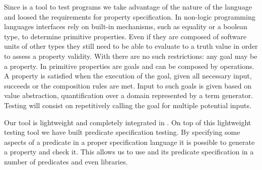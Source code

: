 

Since \plqc{} is a tool to test \Prolog{} programs we take advantage of
the nature of the language and loosed the requirements for property
specification.
%
In non-logic programming languages interfaces rely on built-in mechanisms, such as equality or
a boolean type, to determine primitive properties. %
%
Even if they are composed of software units of other types they still
need to be able to evaluate to a truth value in order to assess a
property validity.
%
With \Prolog{} there are no such restrictions: any goal may be a property.
%
In \plqc{} primitive properties are %
\Prolog{} goals and can be composed by \plqc{} operations.%
%
A property is satisfied when the execution of the goal, given all
necessary input, succeeds or the composition rules are met.
%
Input to such goals is given based on \plqc{} value abstraction,
quantification over a domain represented by a term generator.
%
%
Testing will consist on repetitively calling the goal for multiple
potential inputs.




Our tool is
lightweight and completely integrated in \Prolog{}.
%
On top of this lightweight testing tool we have built predicate
specification testing.
%
By specifying some aspects of a predicate in a proper specification
language it is possible to generate a \plqc{} property and check it.
%
This %
allows us to  use \plqc{} and its predicate specification in a number of
predicates and even libraries.







